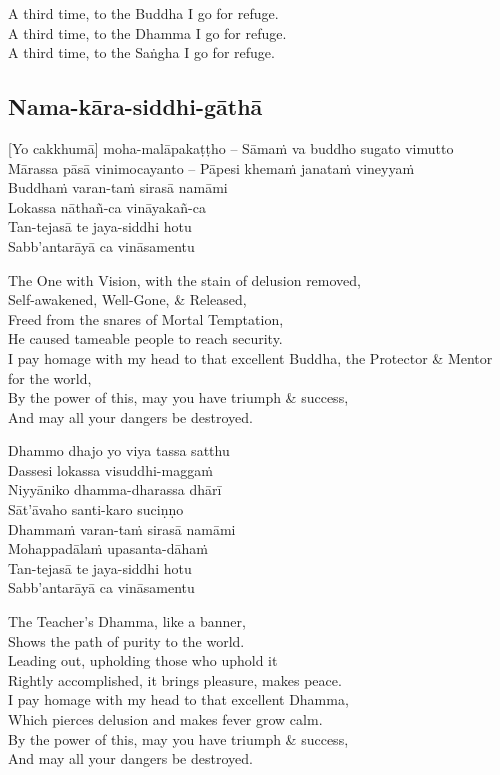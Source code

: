 \begin{english}
  A third time, to the Buddha I go for refuge.\\
  A third time, to the Dhamma I go for refuge.\\
  A third time, to the Saṅgha I go for refuge.
\end{english}

\subsection{Nama-kāra-siddhi-gāthā}
[Yo cakkhumā] moha-malāpakaṭṭho – Sāmaṁ va buddho sugato vimutto\\
Mārassa pāsā vinimocayanto – Pāpesi khemaṁ janataṁ vineyyaṁ\\
Buddhaṁ varan-taṁ sirasā namāmi\\
Lokassa nāthañ-ca vināyakañ-ca\\
Tan-tejasā te jaya-siddhi hotu\\
Sabb’antarāyā ca vināsamentu

\begin{english}
  The One with Vision, with the stain of delusion removed,\\
  Self-awakened, Well-Gone, \& Released,\\
  Freed from the snares of Mortal Temptation,\\
  He caused tameable people to reach security.\\
  I pay homage with my head to that excellent Buddha, the Protector \& Mentor for the world,\\
  By the power of this, may you have triumph \& success,\\
  And may all your dangers be destroyed.
\end{english}

Dhammo dhajo yo viya tassa satthu\\
Dassesi lokassa visuddhi-maggaṁ\\
Niyyāniko dhamma-dharassa dhārī\\
Sāt’āvaho santi-karo suciṇṇo\\
Dhammaṁ varan-taṁ sirasā namāmi\\
Mohappadālaṁ upasanta-dāhaṁ\\
Tan-tejasā te jaya-siddhi hotu\\
Sabb’antarāyā ca vināsamentu

\begin{english}
  The Teacher's Dhamma, like a banner,\\
  Shows the path of purity to the world.\\
  Leading out, upholding those who uphold it\\
  Rightly accomplished, it brings pleasure, makes peace.\\
  I pay homage with my head to that excellent Dhamma,\\
  Which pierces delusion and makes fever grow calm.\\
  By the power of this, may you have triumph \& success,\\
  And may all your dangers be destroyed.
\end{english}

